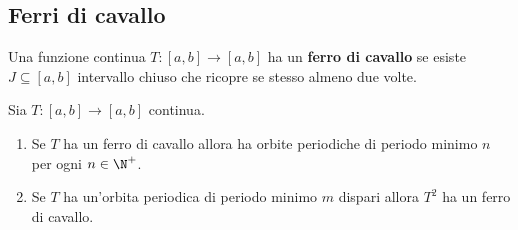 \subsection{Ferri di cavallo}
\begin{definition}
Una funzione continua $T:[a,b]\to[a,b]$ ha un \textbf{ferro di cavallo} se esiste $J\subseteq [a,b]$ intervallo chiuso che ricopre se stesso almeno due volte.
\end{definition}

\begin{proposition}\label{RelazioneFerroDiCavalloEPeriodiMinimi}
Sia $T:[a,b]\to[a,b]$ continua.
\begin{enumerate}
\item Se $T$ ha un ferro di cavallo allora ha orbite periodiche di periodo minimo $n$ per ogni $n\in\N^+$.
\item Se $T$ ha un'orbita periodica di periodo minimo $m$ dispari allora $T^2$ ha un ferro di cavallo. 
\end{enumerate}
\end{proposition}
